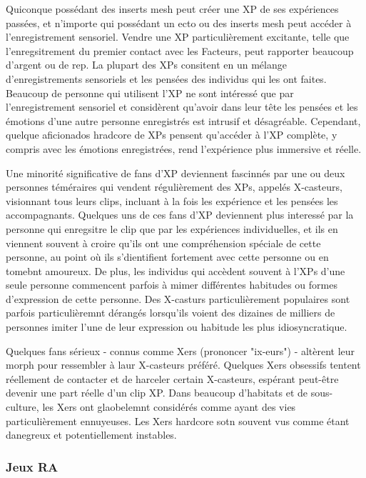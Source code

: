 Quiconque possédant des inserts mesh peut créer une XP de ses expériences passées, et n'importe qui possédant un ecto ou des inserts mesh peut accéder à l'enregistrement sensoriel. Vendre une XP particulièrement excitante, telle que l'enregsitrement du premier contact avec les Facteurs, peut rapporter beaucoup d'argent ou de rep. La plupart des XPs consitent en un mélange d'enregistrements sensoriels et les pensées des individus qui les ont faites. Beaucoup de personne qui utilisent l'XP ne sont intéressé que par l'enregistrement sensoriel et considèrent qu'avoir dans leur tête les pensées et les émotions d'une autre personne enregistrés est intrusif et désagréable. Cependant, quelque aficionados hradcore de XPs pensent qu'accéder à l'XP complète, y compris avec les émotions enregistrées, rend l'expérience plus immersive et réelle. 

Une minorité significative de fans d'XP deviennent fascinnés par une ou deux personnes téméraires qui vendent régulièrement des XPs, appelés X-casteurs, visionnant tous leurs clips, incluant à la fois les expérience et les pensées les accompagnants. Quelques uns de ces fans d'XP deviennent plus interessé par la personne qui enregsitre le clip que par les expériences individuelles, et ils en viennent souvent à croire qu'ils ont une compréhension spéciale de cette personne, au point où ils s'dientifient fortement avec cette personne ou en tomebnt amoureux. De plus, les individus qui accèdent souvent à l'XPs d'une seule personne commencent parfois à mimer différentes habitudes ou formes d'expression de cette personne. Des X-casturs particulièrement populaires sont parfois particulièremnt dérangés lorsqu'ils voient des dizaines de milliers de personnes imiter l'une de leur expression ou habitude les plus idiosyncratique. 

Quelques fans sérieux - connus comme Xers (prononcer "ix-eurs") - altèrent leur morph pour ressembler à laur X-casteurs préféré. Quelques Xers obsessifs tentent réellement de contacter et de harceler certain X-casteurs, espérant peut-être devenir une part réelle d'un clip XP. Dans beaucoup d'habitats et de sous-culture, les Xers ont glaobelemnt considérés comme ayant des vies particulièrement ennuyeuses. Les Xers hardcore sotn souvent vus comme étant danegreux et potentiellement instables. 

\subsubsection{Jeux RA} \label{sec:ar-games} 

